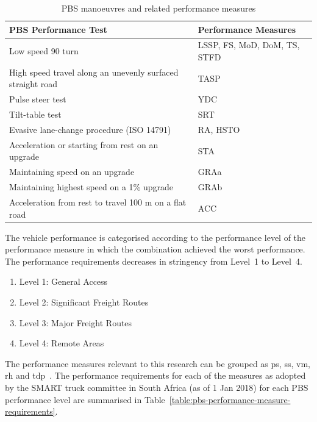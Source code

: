   \begin{table}
    \centering\footnotesize
    \caption{PBS manoeuvres and related performance measures}
    \begin{tabulary}{\textwidth}{LL}
      \toprule
        \textbf{PBS Performance Test}	 & \textbf{Performance Measures}\\
      \midrule
        Low speed 90\degree{} turn & LSSP, FS, MoD, DoM, TS, STFD \\
        High speed travel along an unevenly surfaced straight road & TASP \\
        Pulse steer test & YDC \\
        Tilt-table test & SRT \\
        Evasive lane-change procedure (ISO 14791) & RA, HSTO \\
        Acceleration or starting from rest on an upgrade & STA \\
        Maintaining speed on an upgrade & GRAa \\
        Maintaining highest speed on a 1\% upgrade & GRAb \\
        Acceleration from rest to travel 100 m on a flat road & ACC \\
      \bottomrule
    \end{tabulary}%
    \label{table:pbs-performance-test-summary}
  \end{table}%

The vehicle performance is categorised according to the performance level of the performance measure in which the combination achieved the worst performance. The performance requirements decreases in stringency from Level~1 to Level~4.

\begin{enumerate}
  \item Level 1: General Access
  \item Level 2: Significant Freight Routes
  \item Level 3: Major Freight Routes
  \item Level 4: Remote Areas
\end{enumerate}

The performance measures relevant to this research can be grouped as \gls{ps}, \gls{ss}, \gls{vm}, \gls{rh} and \gls{tdp}~\cite{Arredondo2012}. The performance requirements for each of the measures as adopted by the SMART truck committee in South Africa (as of 1 Jan 2018) for each PBS performance level are summarised in Table~\ref{table:pbs-performance-measure-requirements}.

